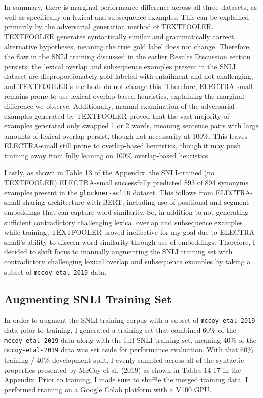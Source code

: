 \documentclass[11pt,a4paper]{article}
\begin{document}
In summary, there is marginal performance difference across all three datasets, as well as specifically on lexical and subsequence examples. This can be explained primarily by the adversarial generation method of TEXTFOOLER. TEXTFOOLER generates syntactically similar and grammatically correct alternative hypotheses, meaning the true gold label does not change. Therefore, the flaw in the SNLI training discussed in the earlier \hyperref[sec:rd]{Results Discussion} section persists: the lexical overlap and subsequence examples present in the SNLI dataset are disproportionately gold-labeled with entailment and not challenging, and TEXTFOOLER's methods do not change this. Therefore, ELECTRA-small remains prone to use lexical overlap-based heuristics, explaining the marginal difference we observe. Additionally, manual examination of the adversarial examples generated by TEXTFOOLER proved that the vast majority of examples generated only swapped 1 or 2 words, meaning sentence pairs with large amounts of lexical overlap persist, though not necessarily at 100\%. This leaves ELECTRA-small still prone to overlap-based heuristics, though it may push training away from fully leaning on 100\% overlap-based heuristics.

Lastly, as shown in Table 13 of the \hyperref[sec:appendix]{Appendix}, the SNLI-trained (no TEXTFOOLER) ELECTRA-small successfully predicted 893 of 894 synonyms examples present in the \texttt{glockner-acl18} dataset. This follows from ELECTRA-small sharing architecture with BERT, including use of positional and segment embeddings that can capture word similarity. So, in addition to not generating sufficient contradictory challenging lexical overlap and subsequence examples while training, TEXTFOOLER proved ineffective for my goal due to ELECTRA-small's ability to discern word similarity through use of embeddings. Therefore, I decided to shift focus to manually augmenting the SNLI training set with contradictory challenging lexical overlap and subsequence examples by taking a subset of \texttt{mccoy-etal-2019} data.

\subsection{Augmenting SNLI Training Set}
In order to augment the SNLI training corpus with a subset of \texttt{mccoy-etal-2019} data prior to training, I generated a training set that combined 60\% of the \texttt{mccoy-etal-2019} data along with the full SNLI training set, meaning 40\% of the \texttt{mccoy-etal-2019} data was set aside for performance evaluation. With that 60\% training / 40\% development split, I evenly sampled across all of the syntactic properties presented by McCoy et al. (2019) as shown in Tables 14-17 in the \hyperref[sec:appendix]{Appendix}. Prior to training, I made sure to shuffle the merged training data. I performed training on a Google Colab platform with a V100 GPU.
\end{document}
